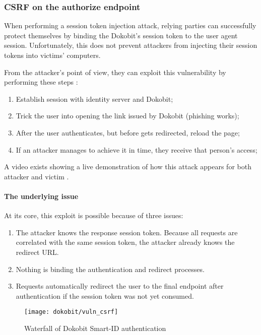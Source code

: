\subsubsection{CSRF on the authorize endpoint}

When performing a session token injection attack, relying parties can successfully protect themselves by binding the Dokobit's session token to the user agent session. Unfortunately, this does not prevent attackers from injecting their session tokens into victims' computers.

From the attacker's point of view, they can exploit this vulnerability by performing these steps \cite{video-exploitdokobit}:

\begin{enumerate}
  \item Establish session with identity server and Dokobit;
  \item Trick the user into opening the link issued by Dokobit (phishing works);
  \item After the user authenticates, but before gets redirected, reload the page;
  \item If an attacker manages to achieve it in time, they receive that person's access;
\end{enumerate}

A video exists showing a live demonstration of how this attack appears for both attacker and victim \cite{video-exploitdokobit}.

\paragraph{The underlying issue}

At its core, this exploit is possible because of three issues: 

\begin{enumerate}
  \item The attacker knows the response session token. Because all requests are correlated with the same session token, the attacker already knows the redirect URL.
  \item Nothing is binding the authentication and redirect processes.
  \item Requests automatically redirect the user to the final endpoint after authentication if the session token was not yet consumed.
\end{enumerate}

\begin{figure}
  \centering
  \texttt{[image: dokobit/vuln\_csrf]}
  \caption{Waterfall of Dokobit Smart-ID authentication}
  \label{fig:dokobit-vuln-csrf}
\end{figure}

